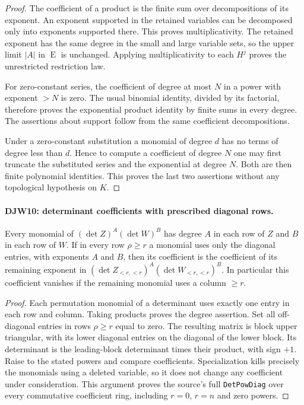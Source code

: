 \begin{proof}
The coefficient of a product is the finite sum over decompositions
of its exponent.  An exponent supported in the retained variables
can be decomposed only into exponents supported there.  This proves
multiplicativity.  The retained exponent has the same degree in
the small and large variable sets, so the upper limit $|A|$ in
$\operatorname{E}$ is unchanged.  Applying multiplicativity to
each $H^j$ proves the unrestricted restriction law.

For zero-constant series, the coefficient of degree at most $N$
in a power with exponent $>N$ is zero.  The usual binomial identity,
divided by its factorial, therefore proves the exponential product
identity by finite sums in every degree.  The assertions about
support follow from the same coefficient decompositions.

Under a zero-constant substitution a monomial of degree $d$ has
no terms of degree less than $d$.  Hence to compute a coefficient
of degree $N$ one may first truncate the substituted series and
the exponential at degree $N$.  Both are then finite polynomial
identities.  This proves the last two assertions without any
topological hypothesis on $K$.
\end{proof}

\paragraph{DJW10: determinant coefficients with prescribed diagonal rows.}
\label{claim:DJW10}
Every monomial of $(\det Z)^A(\det W)^B$ has degree $A$ in
each row of $Z$ and $B$ in each row of $W$.
If in every row $\rho\ge r$ a monomial uses only the diagonal
entries, with exponents $A$ and $B$, then its coefficient is the
coefficient of its remaining exponent in
$(\det Z_{<r,<r})^A(\det W_{<r,<r})^B$.
In particular this coefficient vanishes if the remaining monomial
uses a column $\ge r$.

\begin{proof}
Each permutation monomial of a determinant uses exactly one entry
in each row and column.  Taking products proves the degree assertion.
Set all off-diagonal entries in rows $\rho\ge r$ equal to zero.
The resulting matrix is block upper triangular, with its lower
diagonal entries on the diagonal of the lower block.  Its determinant
is the leading-block determinant times their product, with sign $+1$.
Raise to the stated powers and compare coefficients.
Specialization kills precisely the monomials using a deleted variable,
so it does not change any coefficient under consideration.  This
argument proves the source's full \texttt{DetPowDiag} over every
commutative coefficient ring, including $r=0$, $r=n$ and zero powers.
\end{proof}

